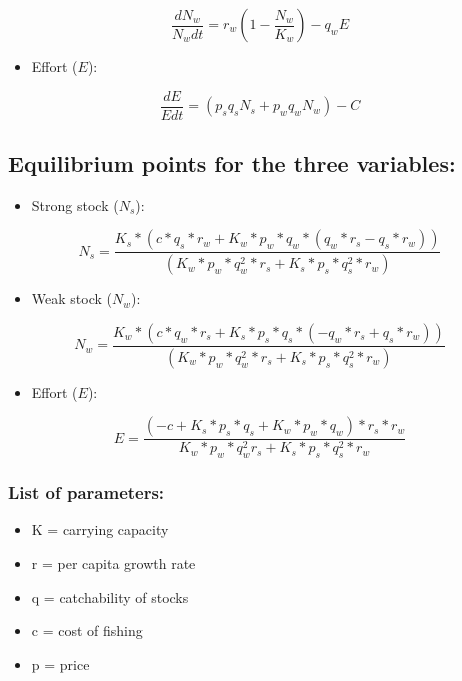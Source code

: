 \documentclass[
]{article}
\providecommand{\tightlist}{%
  \setlength{\itemsep}{0pt}\setlength{\parskip}{0pt}}
\begin{document}
\[
\frac{dN_w}{N_wdt} = r_w (1 - \frac{N_w}{K_w}) - q_w E
\]

\begin{itemize}
\tightlist
\item
  Effort (\(E\)):
\end{itemize}

\[
\frac{dE}{Edt} = (p_s q_s N_s + p_w q_w N_w) - C
\]

\hypertarget{equilibrium-points-for-the-three-variables}{%
\subsection{Equilibrium points for the three
variables:}\label{equilibrium-points-for-the-three-variables}}

\begin{itemize}
\tightlist
\item
  Strong stock (\(N_s\)):
\end{itemize}

\[
N_s = \frac{K_s * (c * q_s * r_w + K_w * p_w * q_w * (q_w * r_s - q_s * r_w))} {(K_w * p_w * q_w^2 * r_s + K_s * p_s * q_s^2 * r_w)}
\]

\begin{itemize}
\tightlist
\item
  Weak stock (\(N_w\)):
\end{itemize}

\[
N_w = \frac{K_w * (c * q_w * r_s + K_s * p_s * q_s * (- q_w * r_s + q_s * r_w))} {(K_w * p_w * q_w^2 * r_s + K_s * p_s * q_s^2 * r_w)}
\]

\begin{itemize}
\tightlist
\item
  Effort (\(E\)):
\end{itemize}

\[
E = \frac{(-c + K_s * p_s * q_s + K_w * p_w * q_w) * r_s * r_w} {K_w * p_w * q_w^2 r_s + K_s * p_s * q_s^2 * r_w}
\]

\hypertarget{list-of-parameters}{%
\subsubsection{List of parameters:}\label{list-of-parameters}}

\begin{itemize}
\tightlist
\item
  K = carrying capacity
\item
  r = per capita growth rate
\item
  q = catchability of stocks
\item
  c = cost of fishing
\item
  p = price
\end{itemize}
\end{document}
